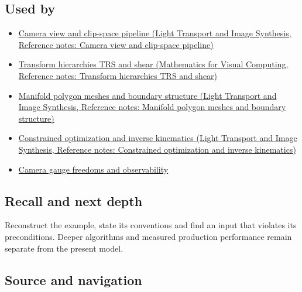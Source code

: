 \subsection{Used by}\label{appendix-1bae9457dbc3-used-by}

\hypertarget{appendix-1bae9457dbc3-used-by}{}

\begin{itemize}
\item
  \href{../04-Light-Transport-and-Image-Synthesis/main.pdf\#nameddest=appendix-1c07d64f5e70}{Camera view and clip-space pipeline (Light Transport and Image Synthesis, Reference notes: Camera view and clip-space pipeline)}
\item
  \href{../02-Mathematics-for-Visual-Computing/main.pdf\#nameddest=appendix-292c061cd47c}{Transform hierarchies TRS and shear (Mathematics for Visual Computing, Reference notes: Transform hierarchies TRS and shear)}
\item
  \href{../04-Light-Transport-and-Image-Synthesis/main.pdf\#nameddest=appendix-fab348609369}{Manifold polygon meshes and boundary structure (Light Transport and Image Synthesis, Reference notes: Manifold polygon meshes and boundary structure)}
\item
  \href{../04-Light-Transport-and-Image-Synthesis/main.pdf\#nameddest=appendix-29f4bea4c2bb}{Constrained optimization and inverse kinematics (Light Transport and Image Synthesis, Reference notes: Constrained optimization and inverse kinematics)}
\item
  \hyperref[appendix-113f0267e5f4]{Camera gauge freedoms and observability}
\end{itemize}

\subsection{Recall and next depth}\label{appendix-1bae9457dbc3-recall-and-next-depth}

\hypertarget{appendix-1bae9457dbc3-recall-and-next-depth}{}

Reconstruct the example, state its conventions and find an input that violates its preconditions. Deeper algorithms and measured production performance remain separate from the present model.

\subsection{Source and navigation}\label{appendix-1bae9457dbc3-source-and-navigation}

